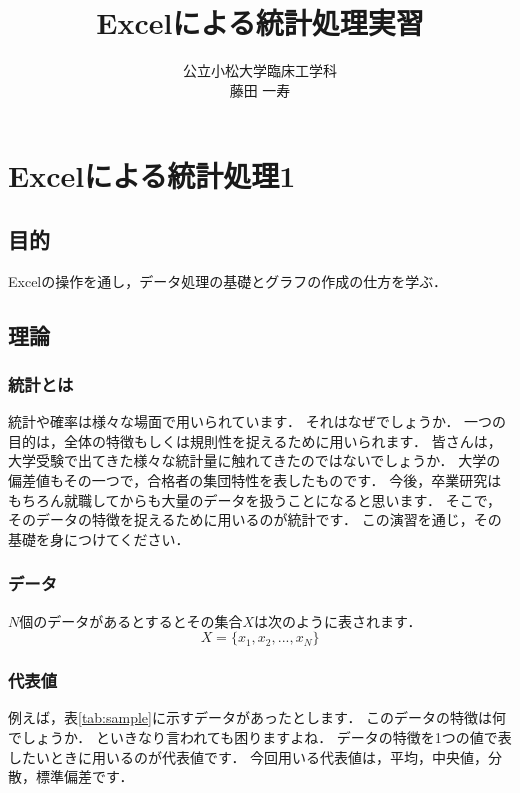 \documentclass[12pt, a4j]{jreport}
\title{Excelによる統計処理実習}
\author{公立小松大学臨床工学科 \\ 藤田 一寿}
\date{}
\begin{document}
\maketitle

\chapter{Excelによる統計処理1}

\section{目的}

Excelの操作を通し，データ処理の基礎とグラフの作成の仕方を学ぶ．

\section{理論}

\subsection{統計とは}

統計や確率は様々な場面で用いられています．
それはなぜでしょうか．
一つの目的は，全体の特徴もしくは規則性を捉えるために用いられます．
皆さんは，大学受験で出てきた様々な統計量に触れてきたのではないでしょうか．
大学の偏差値もその一つで，合格者の集団特性を表したものです．
今後，卒業研究はもちろん就職してからも大量のデータを扱うことになると思います．
そこで，そのデータの特徴を捉えるために用いるのが統計です．
この演習を通じ，その基礎を身につけてください．

\subsection{データ}

$N$個のデータがあるとするとその集合$X$は次のように表されます．
\begin{equation}
    \label{eq:2}
    X = \{x_1, x_2, ..., x_N\}
\end{equation}

\subsection{代表値}

例えば，表\ref{tab:sample}に示すデータがあったとします．
このデータの特徴は何でしょうか．
といきなり言われても困りますよね．
データの特徴を1つの値で表したいときに用いるのが代表値です．
今回用いる代表値は，平均，中央値，分散，標準偏差です．
\end{document}

